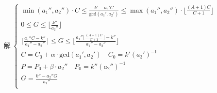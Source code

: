 \documentclass[preview]{standalone}
\begin{document}
\begin{align*}
\text{解}~\begin{cases}\min (a_1'', a_2'') \cdot C \leq \frac{k' - a_3' C}{\mathrm{gcd}(a_1', a_2')} \leq \max (a_1'', a_2'') \cdot \lfloor \frac{(A + 1)C}{C + 1} \rfloor \\0 \leq G \leq \lfloor \frac{k''}{a_2''} \rfloor \\\lceil \frac{a_1'' C - k''}{a_1'' - a_2''} \rceil \leq G \leq \lfloor \frac{a_1'' \lfloor \frac{(A + 1)C}{C + 1} \rfloor - k''}{a_1'' - a_2''} \rfloor \\C = C_0 + \alpha \cdot \mathrm{gcd}(a_1', a_2') \quad C_0 = k' (a_3')^{-1} \\P = P_0 + \beta \cdot a_2'' \quad P_0 = k'' (a_2'')^{-1} \\G = \frac{k'' - a_2'' G}{a_1''} \\\end{cases}
\end{align*}
\end{document}
